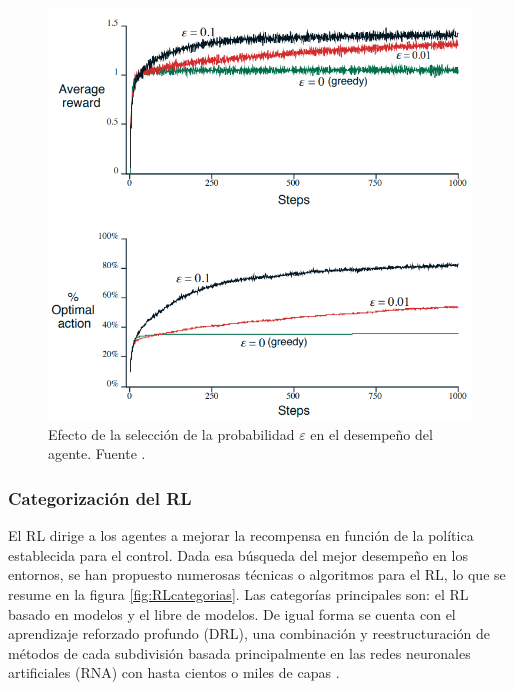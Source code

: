 \begin{figure}[hh]
	\centering
	\includegraphics[scale=0.6]{fig/new/avaro_eps.png}
	\caption{Efecto de la selección de la probabilidad $\varepsilon$ en el desempeño del agente. Fuente \cite{RLIntro}.}
	\label{fig:greedy_eps}
\end{figure}


\subsubsection{Categorización del RL}

El RL dirige a los agentes a mejorar la recompensa en función de la política establecida para el control. Dada esa búsqueda del mejor desempeño en los entornos, se han propuesto numerosas técnicas o algoritmos para el RL, lo que se resume en la figura \ref{fig:RLcategorias}. Las categorías principales son: el RL basado en modelos y el libre de modelos. De igual forma se cuenta con el aprendizaje reforzado profundo (DRL), una combinación y reestructuración de métodos de cada subdivisión basada principalmente en las redes neuronales artificiales (RNA) con hasta cientos o miles de capas \cite{DataScience}.

